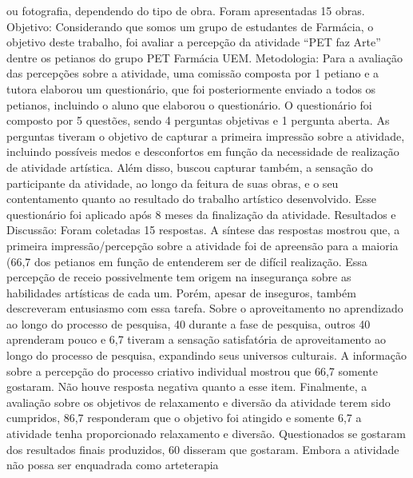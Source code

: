 ou fotografia, dependendo do tipo de obra. Foram apresentadas 15 obras. Objetivo: Considerando 
que somos um grupo de estudantes de Farmácia, o objetivo deste trabalho, foi avaliar a percepção 
da atividade “PET faz Arte” dentre os petianos do grupo PET Farmácia UEM. Metodologia: Para 
a avaliação das percepções sobre a atividade, uma comissão composta por 1 petiano e a tutora 
elaborou um questionário, que foi posteriormente enviado a todos os petianos, incluindo o aluno 
que elaborou o questionário. O questionário foi composto por 5 questões, sendo 4 perguntas 
objetivas e 1 pergunta aberta. As perguntas tiveram o objetivo de capturar a primeira impressão 
sobre a atividade, incluindo possíveis medos e desconfortos em função da necessidade de 
realização de atividade artística. Além disso, buscou capturar também, a sensação do participante 
da atividade, ao longo da feitura de suas obras, e o seu contentamento quanto ao resultado do 
trabalho artístico desenvolvido. Esse questionário foi aplicado após 8 meses da finalização da 
atividade. Resultados e Discussão: Foram coletadas 15 respostas. A síntese das respostas mostrou
que, a primeira impressão/percepção sobre a atividade foi de apreensão para a maioria (66,7%
dos petianos em função de entenderem ser de difícil realização. Essa percepção de receio 
possivelmente tem origem na insegurança sobre as habilidades artísticas de cada um. Porém, 
apesar de inseguros, também descreveram entusiasmo com essa tarefa. Sobre o aproveitamento no 
aprendizado ao longo do processo de pesquisa, 40%
durante a fase de pesquisa, outros 40%
aprenderam pouco e 6,7%
tiveram a sensação satisfatória de aproveitamento ao longo do processo de pesquisa, expandindo 
seus universos culturais. A informação sobre a percepção do processo criativo individual mostrou 
que 66,7%
somente gostaram. Não houve resposta negativa quanto a esse item. Finalmente, a avaliação sobre 
os objetivos de relaxamento e diversão da atividade terem sido cumpridos, 86,7%
responderam que o objetivo foi atingido e somente 6,7%
a atividade tenha proporcionado relaxamento e diversão. Questionados se gostaram dos resultados
finais produzidos, 60%
disseram que gostaram. Embora a atividade não possa ser enquadrada como arteterapia 
